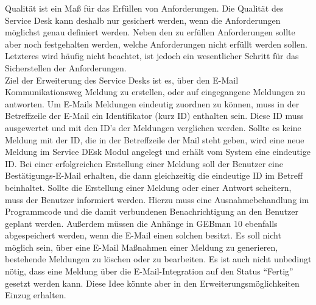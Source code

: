 \noindent
Qualität ist ein Maß für das Erfüllen von Anforderungen. Die Qualität des Service Desk kann deshalb nur gesichert werden, wenn die Anforderungen möglichst genau definiert werden. Neben den zu erfüllen Anforderungen sollte aber noch festgehalten werden, welche Anforderungen nicht erfüllt werden sollen. Letzteres wird häufig nicht beachtet, ist jedoch ein wesentlicher Schritt für das Sicherstellen der Anforderungen.\\
\noindent
Ziel der Erweiterung des Service Desks ist es, über den E-Mail Kommunikationsweg Meldung zu erstellen, oder auf eingegangene Meldungen zu antworten. Um E-Mails Meldungen eindeutig zuordnen zu können, muss in der Betreffzeile der E-Mail ein Identifikator (kurz ID) enthalten sein. Diese ID muss ausgewertet und mit den ID's der Meldungen verglichen werden. Sollte es keine Meldung mit der ID, die in der Betreffzeile der Mail steht geben, wird eine neue Meldung im Service DEsk Modul angelegt und erhält vom System eine eindeutige ID. Bei einer erfolgreichen Erstellung einer Meldung soll der Benutzer eine Bestätigungs-E-Mail erhalten, die dann gleichzeitig die eindeutige ID im Betreff beinhaltet. Sollte die Erstellung einer Meldung oder einer Antwort scheitern, muss der Benutzer informiert werden. Hierzu muss eine Ausnahmebehandlung im Programmcode und die damit verbundenen Benachrichtigung an den Benutzer geplant werden. Außerdem müssen die Anhänge in GEBman 10 ebenfalls abgespeichert werden, wenn die E-Mail einen solchen besitzt. \newline
Es soll nicht möglich sein, über eine E-Mail Maßnahmen einer Meldung zu generieren, bestehende Meldungen zu löschen oder zu bearbeiten. Es ist auch nicht unbedingt nötig, dass eine Meldung über die E-Mail-Integration auf den Status \enquote{Fertig} gesetzt werden kann. Diese Idee könnte aber in den Erweiterungsmöglichkeiten Einzug erhalten.


